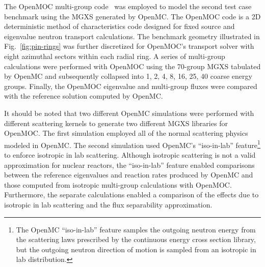 The OpenMOC multi-group code~\citep{boyd2014openmoc} was employed to model the second test case benchmark using the MGXS generated by OpenMC. The OpenMOC code is a 2D deterministic method of characteristics code designed for fixed source and eigenvalue neutron transport calculations. The benchmark geometry illustrated in Fig.~\ref{fig:pin-rings} was further discretized for OpenMOC's transport solver with eight azimuthal sectors within each radial ring. A series of multi-group calculations were performed with OpenMOC using the 70-group MGXS tabulated by OpenMC and subsequently collapsed into 1, 2, 4, 8, 16, 25, 40 coarse energy groups. Finally, the OpenMOC eigenvalue and multi-group fluxes were compared with the reference solution computed by OpenMC.

It should be noted that two different OpenMC simulations were performed with different scattering kernels to generate two different MGXS libraries for OpenMOC. The first simulation employed all of the normal scattering physics modeled in OpenMC. The second simulation used OpenMC's ``iso-in-lab'' feature\footnote{The OpenMC ``iso-in-lab'' feature samples the outgoing neutron energy from the scattering laws prescribed by the continuous energy cross section library, but the outgoing neutron direction of motion is sampled from an isotropic in lab distribution.} to enforce isotropic in lab scattering. Although isotropic scattering is not a valid approximation for nuclear reactors, the ``iso-in-lab'' feature enabled comparisons between the reference eigenvalues and reaction rates produced by OpenMC and those computed from isotropic multi-group calculations with OpenMOC. Furthermore, the separate calculations enabled a comparison of the effects due to isotropic in lab scattering and the flux separability approximation.
